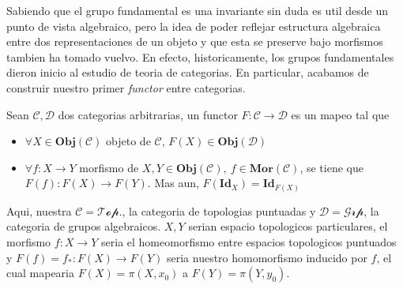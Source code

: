 Sabiendo que el grupo fundamental es una invariante sin duda es util
desde un punto de vista algebraico, pero la idea de poder reflejar
estructura algebraica entre dos representaciones de un objeto y que esta
se preserve bajo morfismos tambien ha tomado vuelvo. En efecto,
historicamente, los grupos fundamentales dieron inicio al estudio de
teoria de categorias. En particular, acabamos de construir nuestro
primer \emph{functor} entre categorias.
\begin{definicion}
  Sean \(\mathscr{C} , \mathscr D\) dos categorias arbitrarias, un
  functor \(F : \mathscr C \to \mathscr D\) es un mapeo tal que
  \begin{itemize}
  \item \(\forall X \in \mathbf{Obj}(\mathscr C)\) objeto de \(\mathscr
    C\), \( F(X) \in \mathbf{Obj} (\mathscr D)\)
  \item  \(\forall f : X \to Y\) morfismo de \(X,Y \in \mathbf{Obj}
    (\mathscr C),\ f \in \mathbf{Mor} (\mathscr C)\), se tiene que \(
    F(f) : F(X) \to F(Y) \). Mas aun, \(F (\mathbf{Id}_X) = \mathbf{Id}_{F(X)}\)
  \end{itemize}
\end{definicion}
Aqui, nuestra \(\mathscr C = \mathscr{Top.}\), la categoria de
topologias puntuadas y \(\mathscr D = \mathscr{Grp}\), la categoria de
grupos algebraicos. \(X,Y\) serian espacio topologicos particulares, el
morfismo \(f : X \to Y\) seria el homeomorfismo entre espacios
topologicos puntuados y \(F(f) = f_{*} : F(X) \to F(Y)\) seria nuestro
homomorfismo inducido por \(f\), el cual mapearia \(F(X) = \pi (X,
x_0)\) a \(F(Y) = \pi (Y, y_0) \).
